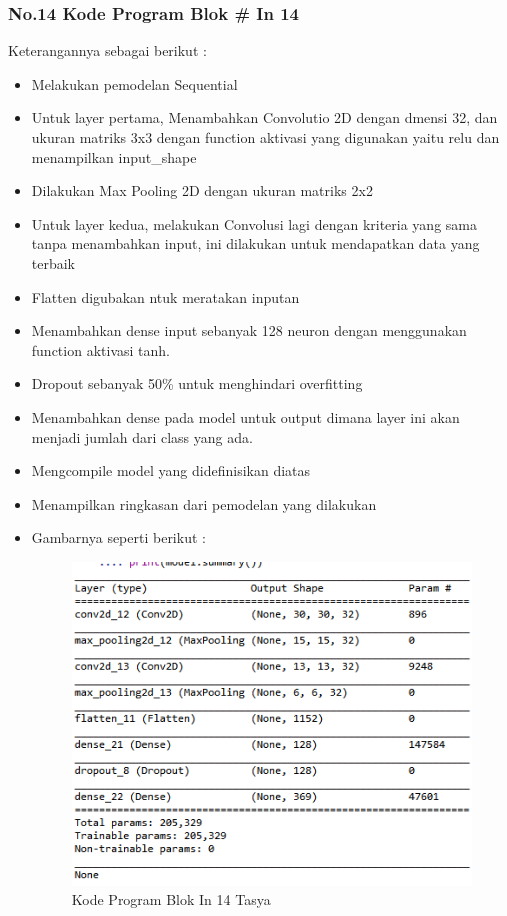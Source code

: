 \subsubsection{No.14 Kode Program Blok \# In 14}

Keterangannya sebagai berikut :\\
\begin{itemize}
\item Melakukan pemodelan Sequential
\item Untuk layer pertama, Menambahkan Convolutio 2D dengan dmensi 32, dan ukuran matriks 3x3 dengan function aktivasi yang digunakan yaitu relu dan menampilkan input\_shape
\item Dilakukan Max Pooling 2D dengan ukuran matriks 2x2
\item Untuk layer kedua, melakukan Convolusi lagi dengan kriteria yang sama tanpa menambahkan input, ini dilakukan untuk mendapatkan data yang terbaik
\item Flatten digubakan ntuk meratakan inputan
\item Menambahkan dense input sebanyak 128 neuron dengan menggunakan function aktivasi tanh.
\item Dropout sebanyak 50\% untuk menghindari overfitting
\item Menambahkan dense pada model untuk output dimana layer ini akan menjadi jumlah dari class yang ada.
\item Mengcompile model yang didefinisikan diatas
\item Menampilkan ringkasan dari pemodelan yang dilakukan
\item Gambarnya seperti berikut :
\begin{figure}[ht]
\centering
\includegraphics[scale=0.5]{figures/Chapter 7/1164086/Praktek/chapter7tasya27.png}
\caption{Kode Program Blok In 14 Tasya}
\label{Praktek}
\end{figure}
\end{itemize}

